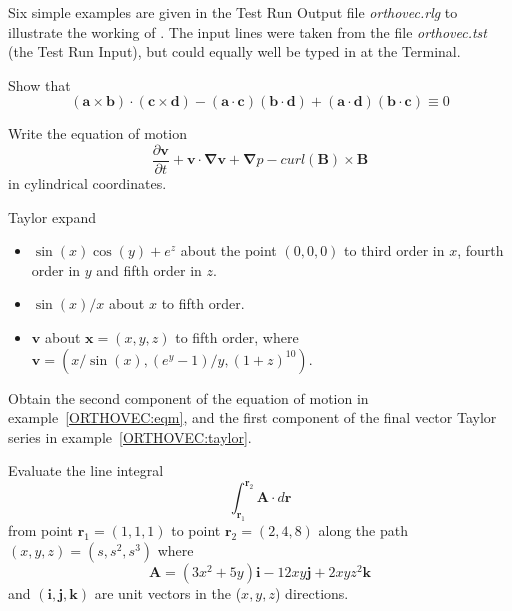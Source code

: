Six  simple examples are given in the Test Run Output file
\emph{orthovec.rlg} to illustrate the working of .
The input lines were taken from the file
\emph{orthovec.tst} (the Test Run Input), but could
equally well be typed in at the Terminal.

\example{}

Show that
\begin{equation*}
(\mathbf{a}  \times \mathbf{b}) \cdot (\mathbf{c} \times \mathbf{d}) - (\mathbf{a}
\cdot \mathbf{c})(\mathbf{b} \cdot \mathbf{d})
 + (\mathbf{a} \cdot \mathbf{d})(\mathbf{b} \cdot \mathbf{c}) \equiv 0
\end{equation*}

\example{}\label{ORTHOVEC:eqm}

Write the equation of motion
\begin{equation*}
\frac{\partial \mathbf{v}}{\partial t} + \mathbf{v} \cdot \mathbf{\nabla v}
+ \mathbf{\nabla} p - curl (\mathbf{B}) \times \mathbf{B}
\end{equation*}
in cylindrical coordinates.

\example{}\label{ORTHOVEC:taylor}

Taylor expand
\begin{itemize}
\item $\sin(x) \cos(y) +e^z$
about the point $(0,0,0)$ to third order in $x$, fourth order in $y$ and
fifth order in $z$.

\item $\sin(x)/x$ about $x$ to fifth order.

\item $\mathbf{v}$ about $\mathbf{x}=(x,y,z)$ to fifth order, where
$\mathbf{v} = (x/ \sin(x),(e^y-1)/y,(1+z)^{10})$.
\end{itemize}

\example{}

Obtain the second component of the equation of motion in
example~\ref{ORTHOVEC:eqm}, and the first component of the final
vector Taylor series in example~\ref{ORTHOVEC:taylor}.

\example{}

Evaluate the line integral
\begin{equation*}
\int^{\mathbf{r}_2}_{\mathbf{r}_1} \mathbf{A} \cdot d\mathbf{r}
\end{equation*}
from point $\mathbf{r}_1 = (1,1,1)$ to point
$\mathbf{r}_2 = (2,4,8)$ along the path $(x,y,z) = (s, s^2, s^3)$ where
\begin{equation*}
\mathbf{A} = (3x^2 + 5y) \mathbf{i} - 12xy\mathbf{j} + 2xyz^2\mathbf{k}
\end{equation*}
and $(\mathbf{i, j, k})$ are unit vectors in the ($x,y,z$) directions.

